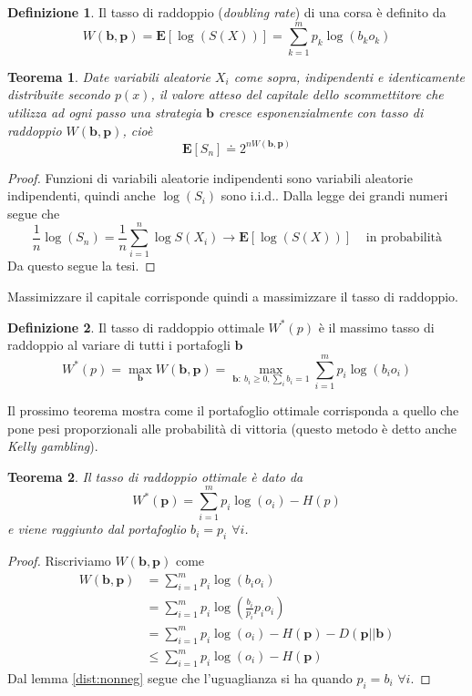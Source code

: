 \documentclass[a4paper,11pt]{book}
\theoremstyle{plain}
\newtheorem{teo}{Teorema}[chapter]
\theoremstyle{definition}
\newtheorem{defn}{Definizione}[chapter]
\theoremstyle{remark}
\newcommand{\B}{\bm{b}}
\newcommand{\E}{\mathbf{E}}
\begin{document}
\begin{defn}
	Il tasso di raddoppio (\textit{doubling rate}) di una corsa è definito da
	\begin{equation*}
		W(\bm{b},\bm{p}) = \mathbf{E}[\log(S(X))] = \sum_{k = 1}^{m}{p_k\log(b_ko_k)}
	\end{equation*}
\end{defn}
\begin{teo}
	Date variabili aleatorie $X_i$ come sopra, indipendenti e identicamente distribuite secondo $p(x)$, il valore atteso del capitale dello scommettitore che utilizza ad ogni passo una strategia $\B$ cresce esponenzialmente con tasso di raddoppio $W(\bm{b},\bm{p})$, cioè
	\begin{equation*}
		\E[S_n] \doteq 2^{nW(\bm{b},\bm{p})}
	\end{equation*}
\end{teo}
\begin{proof}
	Funzioni di variabili aleatorie indipendenti sono variabili aleatorie indipendenti, quindi anche $\log(S_i)$ sono i.i.d.. Dalla legge dei grandi numeri segue che
	\begin{equation*}
		\frac{1}{n}\log(S_n) = \frac{1}{n}\sum_{i = 1}^{n}{\log S(X_i)}\rightarrow \mathbf{E}[\log(S(X))] \;\;\;\; \text{in probabilità}
	\end{equation*}
	Da questo segue la tesi.
\end{proof}
Massimizzare il capitale corrisponde quindi a massimizzare il tasso di raddoppio.
\begin{defn}
	Il tasso di raddoppio ottimale $W^*(p)$ è il massimo tasso di raddoppio al variare di tutti i portafogli $\bm{b}$ 
	\begin{equation*}
	W^*(p) = \max\limits_{\bm{b}}W(\bm{b},\bm{p}) = \max\limits_{\bm{b}:\:b_i\geq 0, \sum_ib_i=1}\sum_{i = 1}^{m}p_i\log(b_io_i)
	\end{equation*}
\end{defn}
Il prossimo teorema mostra come il portafoglio ottimale corrisponda a quello che pone pesi proporzionali alle probabilità di vittoria (questo metodo è detto anche \textit{Kelly gambling}). 
\begin{teo}
	Il tasso di raddoppio ottimale è dato da
	\begin{equation*}
		W^*(\bm{p}) = \sum_{i = 1}^{m}{p_i\log(o_i)}-H(p)
	\end{equation*}
	e viene raggiunto dal portafoglio $b_i = p_i$ $\forall i$.
\end{teo}
\begin{proof}
	Riscriviamo $W(\bm{b},\bm{p})$ come
	\begin{equation*}
		\begin{split}
		W(\bm{b},\bm{p}) & = \sum_{i = 1}^{m}{p_i\log(b_io_i)}\\
		& = \sum_{i = 1}^{m}{p_i\log \left(\frac{b_i}{p_i}p_io_i\right)}\\
		& = \sum_{i=1}^{m}{p_i\log(o_i)}-H(\bm{p})-D(\bm{p}||\bm{b})\\
		& \leq \sum_{i = 1}^{m}{p_i\log(o_i)}-H(\bm{p})
		\end{split}
	\end{equation*}
	Dal lemma \ref{dist:nonneg} segue che l'uguaglianza si ha quando $p_i = b_i$ $\forall i$.
\end{proof}
\end{document}
